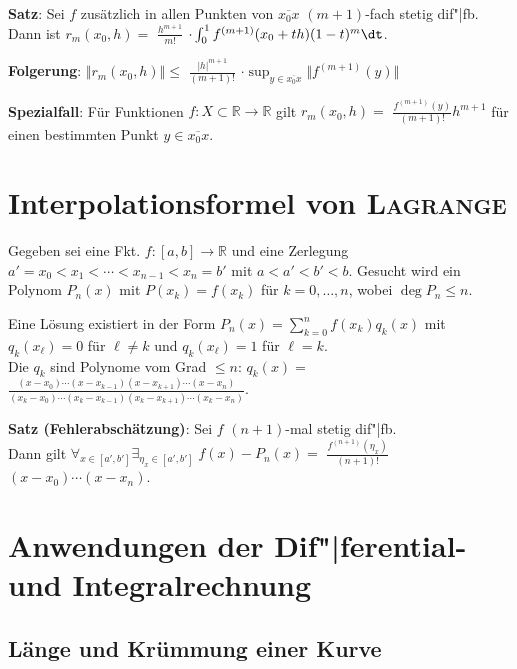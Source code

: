 \textbf{Satz}: Sei $f$ zusätzlich in allen Punkten von $\overline{x_0 x}$
$(m+1)$-fach stetig dif"|fb. \\
Dann ist $r_m(x_0, h) =$ {\large $\frac{h^{m+1}}{m!}$} $\cdot
\int_0^1 f^{(m+1)}(x_0 + th) (1 - t)^m \dt$.

\textbf{Folgerung}:
$\Vert r_m(x_0, h) \Vert \le$ {\large $\frac{|h|^{m+1}}{(m + 1)!}$} $\cdot
\sup_{y \in \overline{x_0 x}} \Vert f^{(m+1)}(y) \Vert$

\textbf{Spezialfall}:
Für Funktionen $f: X \subset \mathbb{R} \rightarrow \mathbb{R}$ gilt
$r_m(x_0, h) =$ {\large $\frac{f^{(m+1)}(y)}{(m + 1)!}$}$h^{m+1}$
für einen bestimmten Punkt $y \in \overline{x_0 x}$.

\pagebreak

\section{%
    Interpolationsformel von \textsc{Lagrange}%
}

Gegeben sei eine Fkt. $f: [a,b] \rightarrow \mathbb{R}$ und eine Zerlegung
$a' = x_0 < x_1 < \cdots < x_{n-1} < x_n = b'$ mit $a < a' < b' < b$.
Gesucht wird ein Polynom $P_n(x)$ mit $P(x_k) = f(x_k)$ für $k = 0, \ldots, n$,
wobei $\deg P_n \le n$.

Eine Lösung existiert in der Form $P_n(x) = \sum_{k=0}^n f(x_k)q_k(x)$
mit $q_k(x_\ell) = 0$ für $\ell \not= k$ und
$q_k(x_\ell) = 1$ für $\ell = k$. \\
Die $q_k$ sind Polynome vom Grad $\le n$: \quad
$q_k(x) =$
{\large $\frac{(x - x_0) \cdots (x - x_{k-1}) (x - x_{k+1}) \cdots (x - x_n)}
{(x_k - x_0) \cdots (x_k - x_{k-1}) (x_k - x_{k+1}) \cdots (x_k - x_n)}$}.

\textbf{Satz (Fehlerabschätzung)}:
Sei $f$ $(n+1)$-mal stetig dif"|fb. \\
Dann gilt $\forall_{x \in [a',b']} \exists_{\eta_x \in [a',b']}\;
f(x) - P_n(x) =$ {\large $\frac{f^{(n+1)}(\eta_x)}{(n + 1)!}$}
$(x - x_0) \cdots (x - x_n)$.

\section{%
    Anwendungen der Dif"|ferential- und Integralrechnung%
}

\subsection{%
    Länge und Krümmung einer Kurve%
}


